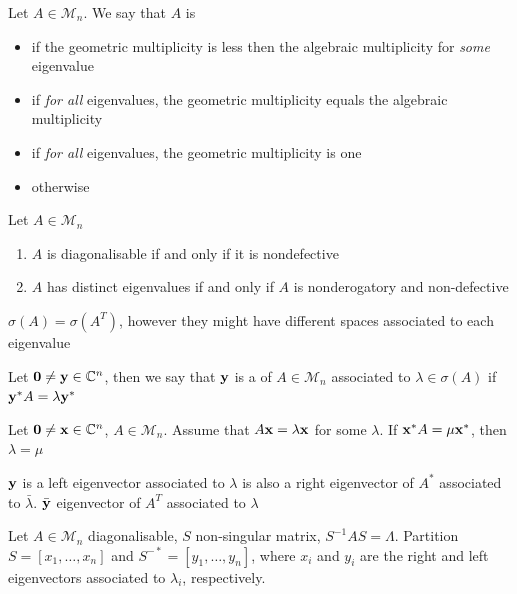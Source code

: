 \documentclass[aspectratio=169]{beamer}
\begin{document}
\begin{frame}
\begin{definition}
Let $A\in \mathcal{M}_n$. We say that $A$ is 
\begin{itemize}
\item {} if the geometric multiplicity is less then the algebraic multiplicity for \emph{some} eigenvalue
\item {} if \emph{for all} eigenvalues, the geometric multiplicity equals the algebraic multiplicity
\item {} if \emph{for all} eigenvalues, the geometric multiplicity is one
\item {} otherwise
\end{itemize} 
\end{definition}

\begin{theorem}\label{th:diagonalisability_fct_nondefective}
Let $A\in \mathcal{M}_n$
\begin{enumerate}
\item $A$ is diagonalisable if and only if it is nondefective
\item $A$ has distinct eigenvalues if and only if $A$ is nonderogatory and non-defective
\end{enumerate} 
\end{theorem}
\end{frame}


\begin{frame}
\begin{remark}
$\sigma(A)=\sigma(A^T)$, however they might have different spaces associated to each eigenvalue
\end{remark}
\vfill
\begin{definition}
Let $\b0\neq \by\in \IC^n$, then we say that $\mathbf{y}$ is a  of $A\in \mathcal{M}_n$ associated to $\lambda\in \sigma(A)$ if $\mathbf{y}^{*}A= \lambda \mathbf{y}^{*}$ 
\end{definition}
\vfill
\begin{theorem}
Let $\b0\neq \bx\in \IC^n$, $A\in \mathcal{M}_n$. Assume that $A\mathbf{x}= \lambda \mathbf{x}$ for some $\lambda$. If $\mathbf{x}^{*}A= \mu \mathbf{x}^{*}$, then $\lambda=\mu$
\end{theorem}
\end{frame}


\begin{frame}
\begin{remark}
$\mathbf{y}$ is a left eigenvector associated to $\lambda$ is also a right eigenvector of $A^{*}$ associated to $\bar{\lambda}$. $\bar{\mathbf{y}}$ eigenvector of $A^T$ associated to $\lambda$
\end{remark}

Let $A\in \mathcal{M}_n$ diagonalisable, $S$ non-singular matrix, $S^{-1} AS = \Lambda$. Partition $S= [ x_1, \ldots, x_n]$ and $S^{-*}=[ y_1, \ldots, y_n]$, where $x_i$ and $y_i$ are the right and left eigenvectors associated to $\lambda_i$, respectively.
\end{frame}
\end{document}

